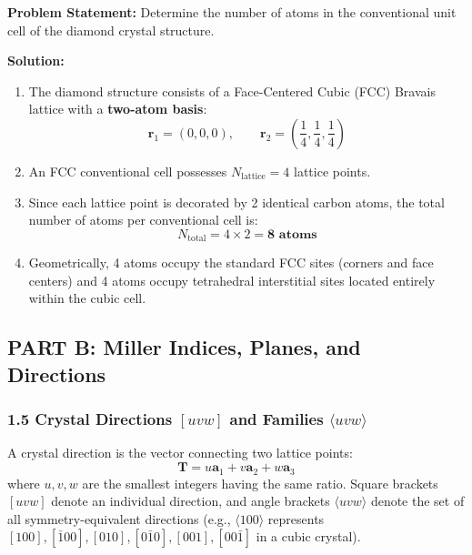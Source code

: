 \documentclass[11pt,a4paper]{article}
\begin{document}
\begin{solbox}
\textbf{Problem Statement:} Determine the number of atoms in the conventional unit cell of the diamond crystal structure.

\textbf{Solution:}
\begin{enumerate}
    \item The diamond structure consists of a Face-Centered Cubic (FCC) Bravais lattice with a \textbf{two-atom basis}:
    \begin{equation}
    \mathbf{r}_1 = (0,0,0), \qquad \mathbf{r}_2 = \left(\frac{1}{4}, \frac{1}{4}, \frac{1}{4}\right)
    \end{equation}
    \item An FCC conventional cell possesses $N_{\text{lattice}} = 4$ lattice points.
    \item Since each lattice point is decorated by 2 identical carbon atoms, the total number of atoms per conventional cell is:
    \begin{equation}
    N_{\text{total}} = 4 \times 2 = \mathbf{8 \text{ atoms}}
    \end{equation}
    \item Geometrically, 4 atoms occupy the standard FCC sites (corners and face centers) and 4 atoms occupy tetrahedral interstitial sites located entirely within the cubic cell.
\end{enumerate}
\end{solbox}

\subsection{PART B: Miller Indices, Planes, and Directions}

\subsubsection{1.5 Crystal Directions \texorpdfstring{$[uvw]$}{[uvw]} and Families \texorpdfstring{$\langle uvw \rangle$}{<uvw>}}
A crystal direction is the vector connecting two lattice points:
\begin{equation}
\mathbf{T} = u\mathbf{a}_1 + v\mathbf{a}_2 + w\mathbf{a}_3
\end{equation}
where $u, v, w$ are the smallest integers having the same ratio. Square brackets $[uvw]$ denote an individual direction, and angle brackets $\langle uvw \rangle$ denote the set of all symmetry-equivalent directions (e.g., $\langle 100 \rangle$ represents $[100], [\bar{1}00], [010], [0\bar{1}0], [001], [00\bar{1}]$ in a cubic crystal).
\end{document}
